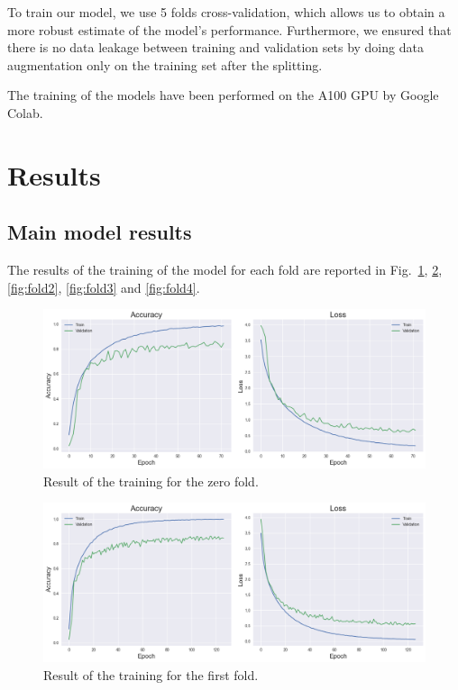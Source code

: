 \documentclass{article}
\begin{document}
\begin{sloppy}
To train our model, we use 5 folds cross-validation, which allows us to obtain a more robust estimate of the model's performance.
Furthermore, we ensured that there is no data leakage between training and validation sets by doing data augmentation only on the
training set after the splitting.

The training of the models have been performed on the A100 GPU by Google Colab.
\section{Results}
\label{sec:results}
\subsection{Main model results}
\label{sec:main_model_results}
The results of the training of the model for each fold are reported in Fig.~\ref{fig:fold0}, \ref{fig:fold1}, \ref{fig:fold2}, \ref{fig:fold3} and \ref{fig:fold4}.
\begin{figure}[ht]
  \centering
  \centerline{\includegraphics[width=\columnwidth]{fold0.png}}
  \caption{Result of the training for the zero fold.}
  \label{fig:fold0}
\end{figure}

\begin{figure}[ht]
  \centering
  \centerline{\includegraphics[width=\columnwidth]{fold1.png}}
  \caption{Result of the training for the first fold.}
  \label{fig:fold1}
\end{figure}


\end{sloppy}
\end{document}
